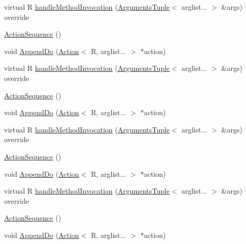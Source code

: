 \begin{DoxyCompactItemize}
\item 
virtual R \mbox{\hyperlink{structfakeit_1_1ActionSequence_a7bc46308e2c35fe407f30045d4ce05a0}{handle\+Method\+Invocation}} (\mbox{\hyperlink{namespacefakeit_a476a37a598825e1b5dd67b3a176491a1}{Arguments\+Tuple}}$<$ arglist... $>$ \&args) override
\item 
\mbox{\hyperlink{structfakeit_1_1ActionSequence_a2c9b1deefcce41af21f9ad4b7b431c7d}{Action\+Sequence}} ()
\item 
void \mbox{\hyperlink{structfakeit_1_1ActionSequence_a1c5ad761d28d11e6886db563e5cb39f6}{Append\+Do}} (\mbox{\hyperlink{structfakeit_1_1Action}{Action}}$<$ R, arglist... $>$ $\ast$action)
\item 
virtual R \mbox{\hyperlink{structfakeit_1_1ActionSequence_a7bc46308e2c35fe407f30045d4ce05a0}{handle\+Method\+Invocation}} (\mbox{\hyperlink{namespacefakeit_a476a37a598825e1b5dd67b3a176491a1}{Arguments\+Tuple}}$<$ arglist... $>$ \&args) override
\item 
\mbox{\hyperlink{structfakeit_1_1ActionSequence_a2c9b1deefcce41af21f9ad4b7b431c7d}{Action\+Sequence}} ()
\item 
void \mbox{\hyperlink{structfakeit_1_1ActionSequence_a1c5ad761d28d11e6886db563e5cb39f6}{Append\+Do}} (\mbox{\hyperlink{structfakeit_1_1Action}{Action}}$<$ R, arglist... $>$ $\ast$action)
\item 
virtual R \mbox{\hyperlink{structfakeit_1_1ActionSequence_a7bc46308e2c35fe407f30045d4ce05a0}{handle\+Method\+Invocation}} (\mbox{\hyperlink{namespacefakeit_a476a37a598825e1b5dd67b3a176491a1}{Arguments\+Tuple}}$<$ arglist... $>$ \&args) override
\item 
\mbox{\hyperlink{structfakeit_1_1ActionSequence_a2c9b1deefcce41af21f9ad4b7b431c7d}{Action\+Sequence}} ()
\item 
void \mbox{\hyperlink{structfakeit_1_1ActionSequence_a1c5ad761d28d11e6886db563e5cb39f6}{Append\+Do}} (\mbox{\hyperlink{structfakeit_1_1Action}{Action}}$<$ R, arglist... $>$ $\ast$action)
\item 
virtual R \mbox{\hyperlink{structfakeit_1_1ActionSequence_a7bc46308e2c35fe407f30045d4ce05a0}{handle\+Method\+Invocation}} (\mbox{\hyperlink{namespacefakeit_a476a37a598825e1b5dd67b3a176491a1}{Arguments\+Tuple}}$<$ arglist... $>$ \&args) override
\item 
\mbox{\hyperlink{structfakeit_1_1ActionSequence_a2c9b1deefcce41af21f9ad4b7b431c7d}{Action\+Sequence}} ()
\item 
void \mbox{\hyperlink{structfakeit_1_1ActionSequence_a1c5ad761d28d11e6886db563e5cb39f6}{Append\+Do}} (\mbox{\hyperlink{structfakeit_1_1Action}{Action}}$<$ R, arglist... $>$ $\ast$action)

\end{DoxyCompactItemize}

